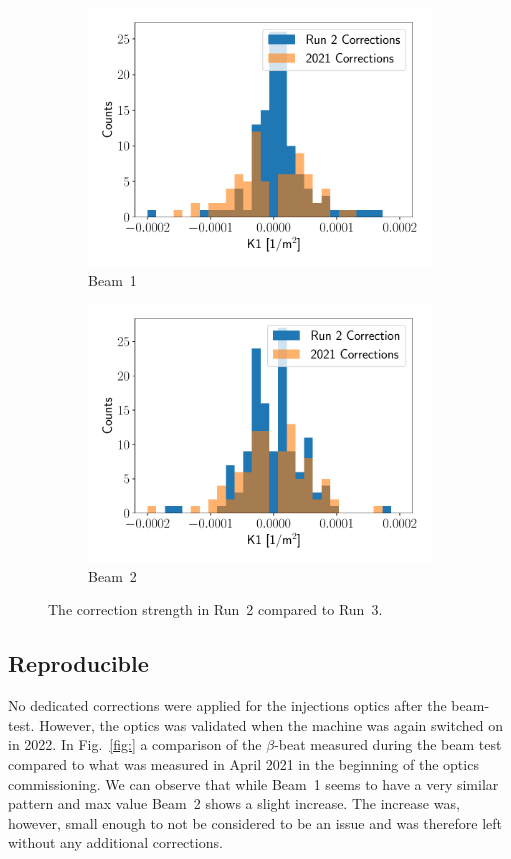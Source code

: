 \documentclass[a4paper]{cernatsnote}
\begin{document}
\begin{figure}[ht]
\begin{subfigure}{.5\textwidth}
  \centering
  \includegraphics[width=.8\linewidth]{beam1_corrections.pdf}  
  \caption{Beam~1}
\end{subfigure}
\begin{subfigure}{.5\textwidth}
  \centering
  \includegraphics[width=.8\linewidth]{beam2_corrections.pdf}  
  \caption{Beam~2}
\end{subfigure}
\caption{The correction strength in Run~2 compared to Run~3.}
\label{fig:corrector_strength_injection}
\end{figure}





\subsection{Reproducible}
No dedicated corrections were applied for the injections optics after the beam-test. However, the optics was validated when the machine was again switched on in 2022. In Fig.~\ref{fig:} a comparison of the $\beta$-beat measured during the beam test compared to what was measured in April 2021 in the beginning of the optics commissioning. We can observe that while Beam~1 seems to have a very similar pattern and max value Beam~2 shows a slight increase. The increase was, however, small enough to not be considered to be an issue and was therefore left without any additional corrections. 
\end{document}
